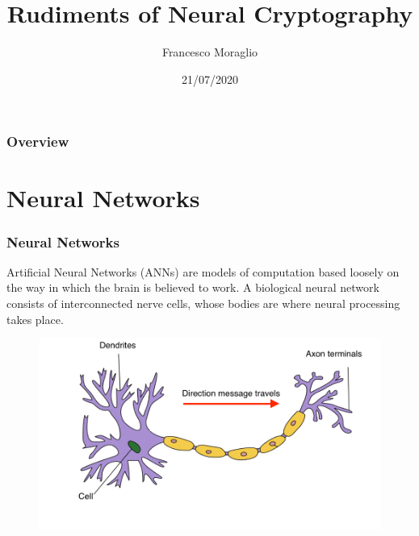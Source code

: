 \documentclass{beamer}
\title[Short title]{Rudiments of Neural Cryptography} %
\author{Francesco Moraglio} %
\institute[UniTO] %
{
University of Torino \\ %
\medskip
}
\date{21/07/2020} %
\begin{document}
\begin{frame}
\titlepage %
\end{frame}

\begin{frame}
\frametitle{Overview} %
\tableofcontents %
\end{frame}


\section{Neural Networks} %



\begin{frame}
\frametitle{Neural Networks}
Artificial Neural Networks (ANNs) are models of computation based loosely on the way in which the brain is believed to work. A biological neural network consists of interconnected nerve cells, whose bodies are where neural processing takes place. \\
\begin{figure}
\centering
\includegraphics[width = \textwidth]{"pictures/neuron.png"}
\end{figure}

\end{frame}
\end{document}
